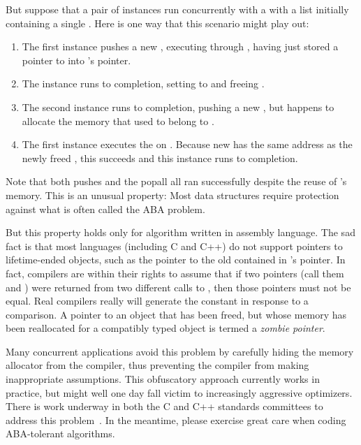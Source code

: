 \begin{fcvref}
But suppose that a pair of  instances run concurrently
with a  with a list initially containing a single
.
Here is one way that this scenario might play out:

\begin{enumerate}
\item	The first  instance pushes a new ,
	executing through , having just stored
	a pointer to  into 's  pointer.
\item	The  instance runs to completion,
	setting  to  and freeing .
\item	The second  instance runs to completion,
	pushing a new , but happens to allocate the memory
	that used to belong to .
\item	The first  instance executes the 
	on .
	Because new  has the same address as the newly freed ,
	this  succeeds and this  instance
	runs to completion.
\end{enumerate}

Note that both pushes and the popall all ran successfully despite the
reuse of 's memory.
This is an unusual property:
Most data structures require protection against what is often called
the ABA problem.

But this property holds only for algorithm written in assembly
language.
The sad fact is that most languages (including C and C++) do not support
pointers to lifetime-ended objects, such as the pointer to the old 
contained in 's  pointer.
In fact, compilers are within their rights to assume that if two pointers
(call them  and ) were returned from two different calls to
, then those pointers must not be equal.
Real compilers really will generate the constant  in
response to a  comparison.
A pointer to an object that has been freed, but whose memory has been
reallocated for a compatibly typed object is termed a \emph{zombie pointer}.

Many concurrent applications avoid this problem by carefully hiding the
memory allocator from the compiler, thus preventing the compiler from
making inappropriate assumptions.
This obfuscatory approach currently works in practice, but might well
one day fall victim to increasingly aggressive optimizers.
There is work underway in both the C and C++ standards committees
to address this
problem~\cite{PaulEMcKenney2019PointerLifetimeEndZap,PaulEMcKenney2020PointerLifetimeEndZapCpp}.
In the meantime, please exercise great care when coding ABA-tolerant
algorithms.
\end{fcvref}

